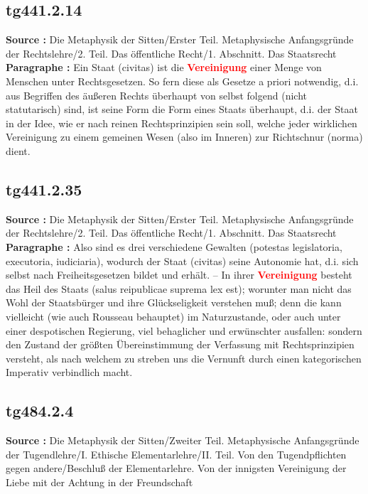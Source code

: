 \documentclass[a4paper,12pt,twoside]{book}
\newcommand{\match}[1]{\textcolor{red}{\textbf{#1}}}
\begin{document}
	\subsection*{tg441.2.14} 
	\textbf{Source : }Die Metaphysik der Sitten/Erster Teil. Metaphysische Anfangsgründe der Rechtslehre/2. Teil. Das öffentliche Recht/1. Abschnitt. Das Staatsrecht\\  
	
	\textbf{Paragraphe : }Ein Staat (civitas) ist die \match{Vereinigung} einer Menge von Menschen unter Rechtsgesetzen. So fern diese als Gesetze a priori notwendig, d.i. aus Begriffen des äußeren Rechts überhaupt von selbst folgend (nicht statutarisch) sind, ist seine Form die Form eines Staats überhaupt, d.i. der Staat in der Idee, wie er nach reinen Rechtsprinzipien sein soll, welche jeder wirklichen Vereinigung zu einem gemeinen Wesen (also im Inneren) zur Richtschnur (norma) dient. 
	
	\subsection*{tg441.2.35} 
	\textbf{Source : }Die Metaphysik der Sitten/Erster Teil. Metaphysische Anfangsgründe der Rechtslehre/2. Teil. Das öffentliche Recht/1. Abschnitt. Das Staatsrecht\\  
	
	\textbf{Paragraphe : }Also sind es drei verschiedene Gewalten (potestas legislatoria, executoria, iudiciaria), wodurch der Staat (civitas) seine Autonomie hat, d.i. sich selbst nach Freiheitsgesetzen bildet und erhält. – In ihrer \match{Vereinigung} besteht das Heil des Staats (salus reipublicae suprema lex est); worunter man nicht das Wohl der Staatsbürger und ihre Glückseligkeit verstehen muß; denn die kann vielleicht (wie auch Rousseau behauptet) im Naturzustande, oder auch unter einer despotischen Regierung, viel behaglicher und erwünschter ausfallen: sondern den Zustand der größten Übereinstimmung der Verfassung mit Rechtsprinzipien versteht, als nach welchem zu streben uns die Vernunft durch einen kategorischen Imperativ verbindlich macht. 
	
	\subsection*{tg484.2.4} 
	\textbf{Source : }Die Metaphysik der Sitten/Zweiter Teil. Metaphysische Anfangsgründe der Tugendlehre/I. Ethische Elementarlehre/II. Teil. Von den Tugendpflichten gegen andere/Beschluß der Elementarlehre. Von der innigsten Vereinigung der Liebe mit der Achtung in der Freundschaft\\  
	
\end{document}
